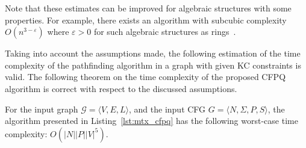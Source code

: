 Note that these estimates can be improved for algebraic structures with some properties. For example, there exists an algorithm with subcubic complexity $O(n^{3 - \varepsilon})$ where $\varepsilon > 0$ for such algebraic structures as rings~\cite{strassen1969gaussian}.

Taking into account the assumptions made, the following estimation of the time complexity of the pathfinding algorithm in a graph with given KC constraints is valid.
The following theorem on the time complexity of the proposed CFPQ algorithm is correct with respect to the discussed assumptions.

\begin{theorem}\label{thm:time_mtx}
	For the input graph $\mathcal{G} = \langle V, E, L \rangle$, and the input CFG $G =\langle N, \Sigma, P, S \rangle$, the algorithm presented in Listing~\ref{lst:mtx_cfpq} has the following worst-case time complexity: $O(|N||P||V|^5)$.
\end{theorem}
